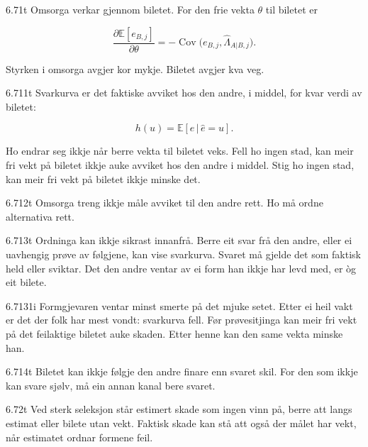 \begin{formproposition}{6.71}{t}
Omsorga verkar gjennom biletet. For den frie vekta \(\theta\) til biletet er

\[
\frac{\partial\mathbb E[e_{B,j}]}{\partial\theta}=-\operatorname{Cov}\bigl(e_{B,j},\hat\Lambda_{A|B,j}\bigr).
\]

Styrken i omsorga avgjer kor mykje. Biletet avgjer kva veg.
\end{formproposition}

\begin{formproposition}{6.711}{t}
Svarkurva er det faktiske avviket hos den andre, i middel, for kvar verdi av biletet:

\[
h(u)=\mathbb E[e\,|\,\hat e=u].
\]

Ho endrar seg ikkje når berre vekta til biletet veks. Fell ho ingen stad, kan meir fri vekt på biletet ikkje auke avviket hos den andre i middel. Stig ho ingen stad, kan meir fri vekt på biletet ikkje minske det.
\end{formproposition}

\begin{formproposition}{6.712}{t}
Omsorga treng ikkje måle avviket til den andre rett. Ho må ordne alternativa rett.
\end{formproposition}

\begin{formproposition}{6.713}{t}
Ordninga kan ikkje sikrast innanfrå. Berre eit svar frå den andre, eller ei uavhengig prøve av følgjene, kan vise svarkurva. Svaret må gjelde det som faktisk held eller sviktar. Det den andre ventar av ei form han ikkje har levd med, er òg eit bilete.
\end{formproposition}

\begin{formproposition}{6.7131}{i}
Formgjevaren ventar minst smerte på det mjuke setet. Etter ei heil vakt er det der folk har mest vondt: svarkurva fell. Før prøvesitjinga kan meir fri vekt på det feilaktige biletet auke skaden. Etter henne kan den same vekta minske han.
\end{formproposition}

\begin{formproposition}{6.714}{t}
Biletet kan ikkje følgje den andre finare enn svaret skil. For den som ikkje kan svare sjølv, må ein annan kanal bere svaret.
\end{formproposition}

\begin{formproposition}{6.72}{t}
Ved sterk seleksjon står estimert skade som ingen vinn på, berre att langs estimat eller bilete utan vekt. Faktisk skade kan stå att også der målet har vekt, når estimatet ordnar formene feil.
\end{formproposition}

